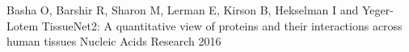 \begin{cvparagraph}
  \minimalcventry
    {Basha O, Barshir R, Sharon M, Lerman E, Kirson B, Hekselman I and Yeger-Lotem}
    {TissueNet2: A quantitative view of proteins and their interactions across human tissues}
    {Nucleic Acids Research}
    {2016}
\end{cvparagraph}
